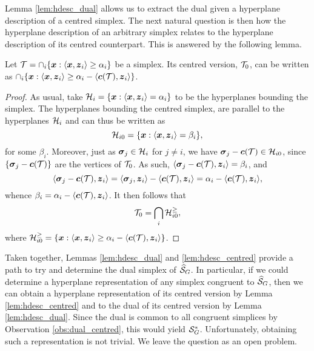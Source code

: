 Lemma \ref{lem:hdesc_dual} allows us to extract the dual given a hyperplane description of a centred simplex. The next natural question is then how the hyperplane description of an arbitrary simplex relates to the hyperplane description of its centred counterpart. This is answered by the following lemma. 

\begin{lemma}
	\label{lem:hdesc_centred}
	Let $\mathcal{T}=\cap_i \{\vb*{x}:\langle \vb*{x},\vb*{z}_i\rangle \geq \alpha_i\}$ be a simplex. Its centred version, $\mathcal{T}_0$, can be written as $\cap_i \{\vb*{x}:\langle \vb*{x},\vb*{z}_i\rangle \geq \alpha_i - \langle \vb*{c}(\mathcal{T}),\vb*{z}_i\rangle\}$. 
\end{lemma}
\begin{proof}
	As usual, take $\mathcal{H}_i = \{\vb*{x}:\langle \vb*{x},\vb*{z}_i\rangle = \alpha_i\}$ to be the hyperplanes bounding the simplex. The hyperplanes bounding the centred simplex, are parallel to the hyperplanes $\mathcal{H}_i$ and can thus be written as 
	\[\mathcal{H}_{i0} = \{\vb*{x}:\langle \vb*{x},\vb*{z}_i\rangle = \beta_i\},\]
	for some $\beta_i$. Moreover, just as $\vb*{\sigma}_j\in\mathcal{H}_i$ for $j\neq i$, we have $\vb*{\sigma}_j-\vb*{c}(\mathcal{T})\in \mathcal{H}_{i0}$, since $\{\vb*{\sigma}_j-\vb*{c}(\mathcal{T})\}$ are the vertices of $\mathcal{T}_0$. As such, $\langle \vb*{\sigma}_j-\vb*{c}(\mathcal{T}),\vb*{z}_i\rangle=\beta_i$, and 
	\[\langle \vb*{\sigma}_j-\vb*{c}(\mathcal{T}),\vb*{z}_i\rangle = \langle \vb*{\sigma}_j,\vb*{z}_i\rangle - \langle\vb*{c}(\mathcal{T}),\vb*{z}_i\rangle = \alpha_i - \langle\vb*{c}(\mathcal{T}),\vb*{z}_i\rangle,\]
	whence $\beta_i = \alpha_i - \langle\vb*{c}(\mathcal{T}),\vb*{z}_i\rangle$. It then follows that 
	\[\mathcal{T}_0=\bigcap_i \mathcal{H}_{i0}^{\geq },\]
	where $\mathcal{H}_{i0}^\geq = \{\vb*{x}:\langle \vb*{x},\vb*{z}_i\rangle \geq  \alpha_i - \langle \vb*{c}(\mathcal{T}),
	\vb*{z}_i\rangle\}$. 
\end{proof}

Taken together, Lemmas \ref{lem:hdesc_dual} and \ref{lem:hdesc_centred} provide a path to try and determine the dual simplex of $\widehat{\mathcal{S}}_G$. In particular, if we could determine a hyperplane representation of any simplex congruent to $\widehat{\mathcal{S}}_G$,  then we can obtain a hyperplane representation of its centred version by Lemma \ref{lem:hdesc_centred} and to the dual of its centred version by Lemma \ref{lem:hdesc_dual}. Since the dual is common to all congruent simplices by Observation \ref{obs:dual_centred}, this would yield $\mathcal{S}_G^*$. Unfortunately, obtaining such a representation is  not trivial. We leave the question as an  open problem. 

 





